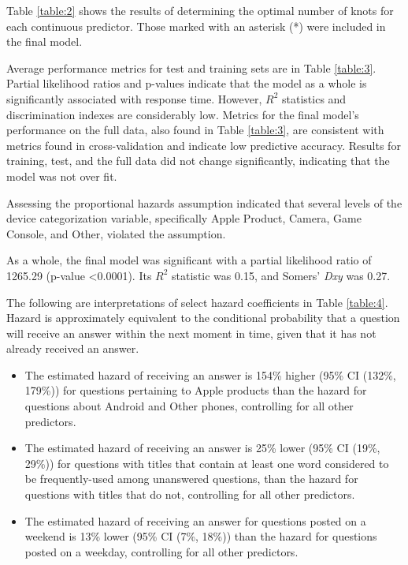 \documentclass[]{interact}\usepackage[]{graphicx}\usepackage[]{color}
\begin{document}
Table \ref{table:2} shows the results of determining the optimal number of knots for each continuous predictor. Those marked with an asterisk (*) were included in the final model. 

Average performance metrics for test and training sets are in Table \ref{table:3}. Partial likelihood ratios and p-values indicate that the model as a whole is significantly associated with response time. However, $R^2$ statistics and discrimination indexes are considerably low. Metrics for the final model's performance on the full data, also found in Table \ref{table:3}, are consistent with metrics found in cross-validation and indicate low predictive accuracy. Results for training, test, and the full data did not change significantly, indicating that the model was not over fit. 



Assessing the proportional hazards assumption indicated that several levels of the device categorization variable, specifically Apple Product, Camera, Game Console, and Other, violated the assumption. 

As a whole, the final model was significant with a partial likelihood ratio of 1265.29 (p-value \textless0.0001). Its $R^2$ statistic was 0.15, and Somers' \textit{Dxy} was 0.27. 

The following are interpretations of select hazard coefficients in Table \ref{table:4}. Hazard is approximately equivalent to the conditional probability that a question will receive an answer within the next moment in time, given that it has not already received an answer. 




\begin{itemize}
  \item The estimated hazard of receiving an answer is 154\% higher (95\% CI (132\%, 179\%)) for questions pertaining to Apple products than the hazard for questions about Android and Other phones, controlling for all other predictors.
  \item The estimated hazard of receiving an answer is 25\% lower (95\% CI (19\%, 29\%)) for questions with titles that contain at least one word considered to be frequently-used among unanswered questions, than the hazard for questions with titles that do not, controlling for all other predictors. 
  \item The estimated hazard of receiving an answer for questions posted on a weekend is 13\% lower (95\% CI (7\%, 18\%)) than the hazard for questions posted on a weekday, controlling for all other predictors.
\end{itemize}
\end{document}
